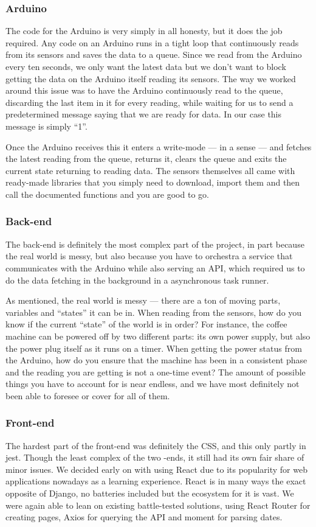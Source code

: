 \documentclass[12pt,a4paper,oneside,article]{memoir}
\numberwithin{equation}{chapter}
\begin{document}
\subsubsection{Arduino}\label{sec:arduino}
The code for the Arduino is very simply in all honesty, but it does the job
required. Any code on an Arduino runs in a tight loop that continuously reads
from its sensors and saves the data to a queue. Since we read from the Arduino
every ten seconds, we only want the latest data but we don't want to block
getting the data on the Arduino itself reading its sensors. The way we worked
around this issue was to have the Arduino continuously read to the queue,
discarding the last item in it for every reading, while waiting for us to send a
predetermined message saying that we are ready for data. In our case this
message is simply ``1''.

Once the Arduino receives this it enters a write-mode --- in a sense --- and
fetches the latest reading from the queue, returns it, clears the queue and
exits the current state returning to reading data. The sensors themselves all
came with ready-made libraries that you simply need to download, import them and
then call the documented functions and you are good to go.

\subsubsection{Back-end}\label{sec:back-end}
The back-end is definitely the most complex part of the project, in part because
the real world is messy, but also because you have to orchestra a service that
communicates with the Arduino while also serving an API, which required us to do
the data fetching in the background in a asynchronous task runner.

As mentioned, the real world is messy --- there are a ton of moving parts,
variables and ``states'' it can be in. When reading from the sensors, how do you
know if the current ``state'' of the world is in order? For instance, the coffee
machine can be powered off by two different parts: its own power supply, but
also the power plug itself as it runs on a timer. When getting the power status
from the Arduino, how do you ensure that the machine has been in a consistent
phase and the reading you are getting is not a one-time event? The amount of
possible things you have to account for is near endless, and we have most
definitely not been able to foresee or cover for all of them.

\subsubsection{Front-end}\label{sec:front-end}
The hardest part of the front-end was definitely the CSS, and this only partly
in jest. Though the least complex of the two -ends, it still had its own fair
share of minor issues. We decided early on with using React due to its
popularity for web applications nowadays as a learning experience. React is in
many ways the exact opposite of Django, no batteries included but the ecosystem
for it is vast. We were again able to lean on existing battle-tested solutions,
using React Router for creating pages, Axios for querying the API and moment for
parsing dates.
\end{document}
